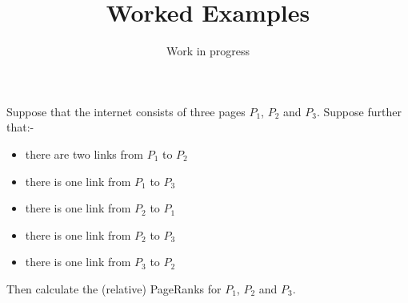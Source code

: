 \documentclass{article}
\title{Worked Examples}
\author{Work in progress}
\begin{document}
\maketitle
\tableofcontents

\begin{Exercise}
  Suppose that the internet consists of three pages $P_1$, $P_2$ and $P_3$.
  Suppose further that:-
  \begin{itemize}
    \item there are two links from $P_1$ to $P_2$
    \item there is one link from $P_1$ to $P_3$
    \item there is one link from $P_2$ to $P_1$
    \item there is one link from $P_2$ to $P_3$
    \item there is one link from $P_3$ to $P_2$
  \end{itemize}
  Then calculate the (relative) PageRanks for $P_1$, $P_2$ and $P_3$.
\end{Exercise}
\end{document}
